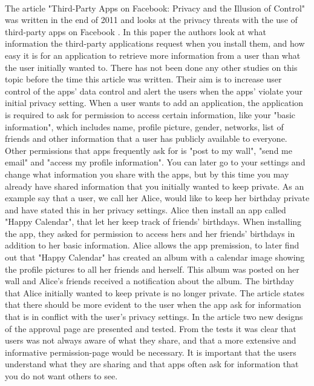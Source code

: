 \paragraph{}
The article "Third-Party Apps on Facebook: Privacy and the Illusion of Control" was written in the end of 2011 and looks at the privacy threats with the use of third-party apps on Facebook \cite{thirdPartyApps}. In this paper the authors look at what information the third-party applications request when you install them, and how easy it is for an application to retrieve more information from a user than what the user initially wanted to. There has not been done any other studies on this topic before the time this article was written. Their aim is to increase user control of the apps' data control and alert the users when the apps' violate your initial privacy setting. When a user wants to add an application, the application is required to ask for permission to access certain information, like your "basic information", which includes name, profile picture, gender, networks, list of friends and other information that a user has publicly available to everyone. Other permissions that apps frequently ask for is "post to my wall", "send me email" and "access my profile information". You can later go to your settings and change what information you share with the apps, but by this time you may already have shared information that you initially wanted to keep private. As an example say that a user, we call her Alice, would like to keep her birthday private and have stated this in her privacy settings. Alice then install an app called "Happy Calendar", that let her keep track of friends' birthdays. When installing the app, they asked for permission to access hers and her friends' birthdays in addition to her basic information. Alice allows the app premission, to later find out that "Happy Calendar" has created an album with a calendar image showing the profile pictures to all her friends and herself. This album was posted on her wall and Alice's friends received a notification about the album. The birthday that Alice initially wanted to keep private is no longer private. The article states that there should be more evident to the user when the app ask for information that is in conflict with the user's privacy settings. In the article two new designs of the approval page are presented and tested.  From the tests it was clear that users was not always aware of what they share, and that a more extensive and informative permission-page would be necessary. It is important that the users understand what they are sharing and that apps often ask for information that you do not want others to see.


